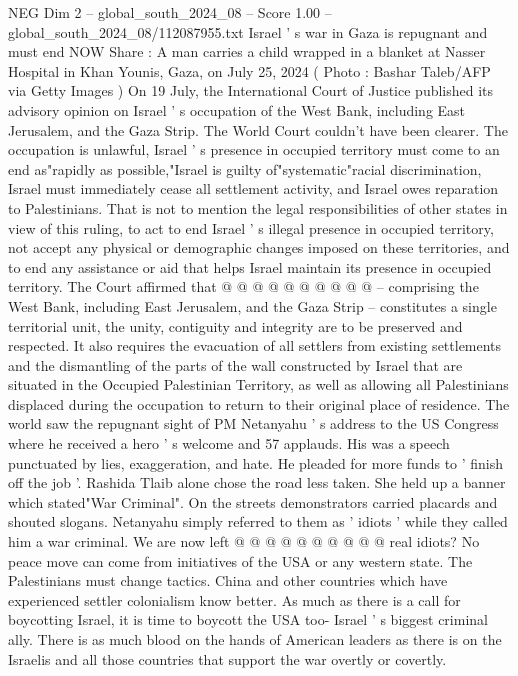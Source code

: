 \begin{textsample}{NEG Dim 2 – global\_south\_2024\_08 – Score 1.00 – global\_south\_2024\_08/112087955.txt}  \label{ex:f2_neg_430}
Israel ' s war in Gaza is repugnant and must end NOW Share : A man carries a child wrapped in a blanket at Nasser Hospital in Khan Younis, Gaza, on July 25, 2024 ( Photo : Bashar Taleb/AFP via Getty Images ) On 19 July, the International Court of Justice published its advisory opinion on Israel ' s occupation of the West Bank, including East Jerusalem, and the Gaza Strip.
The World Court couldn't have been clearer.
The occupation is unlawful, Israel ' s presence in occupied territory must come to an end as"rapidly as possible,"Israel is guilty of"systematic"racial discrimination, Israel must immediately cease all settlement activity, and Israel owes reparation to Palestinians.
That is not to mention the legal responsibilities of other states in view of this ruling, to act to end Israel ' s illegal presence in occupied territory, not accept any physical or demographic changes imposed on these territories, and to end any assistance or aid that helps Israel maintain its presence in occupied territory.
The Court affirmed that @ @ @ @ @ @ @ @ @ @ -- comprising the West Bank, including East Jerusalem, and the Gaza Strip -- constitutes a single territorial unit, the unity, contiguity and integrity are to be preserved and respected.
It also requires the evacuation of all settlers from existing settlements and the dismantling of the parts of the wall constructed by Israel that are situated in the Occupied Palestinian Territory, as well as allowing all Palestinians displaced during the occupation to return to their original place of residence.
The world saw the repugnant sight of PM Netanyahu ' s address to the US Congress where he received a hero ' s welcome and 57 applauds.
His was a speech punctuated by lies, exaggeration, and hate.
He pleaded for more funds to ' finish off the job '.
Rashida Tlaib alone chose the road less taken.
She held up a banner which stated"War Criminal".
On the streets demonstrators carried placards and shouted slogans.
Netanyahu simply referred to them as ' idiots ' while they called him a war criminal.
We are now left @ @ @ @ @ @ @ @ @ @ real idiots?
No peace move can come from initiatives of the USA or any western state.
The Palestinians must change tactics.
China and other countries which have experienced settler colonialism know better.
As much as there is a call for boycotting Israel, it is time to boycott the USA too- Israel ' s biggest criminal ally.
There is as much blood on the hands of American leaders as there is on the Israelis and all those countries that support the war overtly or covertly.

\end{textsample}
